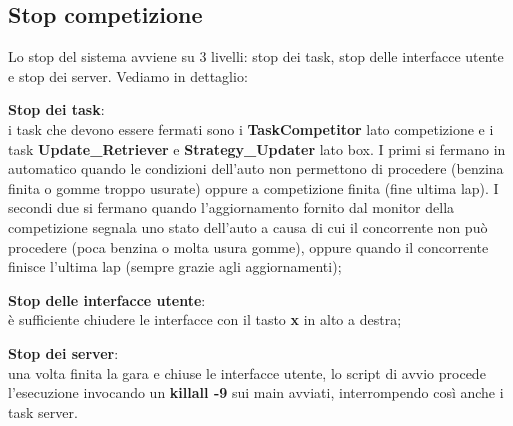 \subsection{Stop competizione}
Lo stop del sistema avviene su 3 livelli: stop dei task, stop delle interfacce
utente e stop dei server. Vediamo in dettaglio:
\begin{description}
\item{\textbf{Stop dei task}}:\\
i task che devono essere fermati sono i \textbf{TaskCompetitor} lato
competizione e i task \textbf{Update\_Retriever} e \textbf{Strategy\_Updater}
lato box.
I primi si fermano in automatico quando le condizioni dell'auto non permettono
di procedere (benzina finita o gomme troppo usurate) oppure a competizione
finita
(fine ultima lap). I secondi due si fermano quando l'aggiornamento fornito dal
monitor della competizione segnala uno stato dell'auto a causa di cui il 
concorrente non pu\`{o} procedere (poca benzina o molta usura gomme), oppure
quando il concorrente finisce l'ultima lap (sempre grazie agli aggiornamenti);
\item{\textbf{Stop delle interfacce utente}}:\\
\`{e} sufficiente chiudere le interfacce con il tasto \textbf{x} in alto a
destra;
\item{\textbf{Stop dei server}}:\\
una volta finita la gara e chiuse le interfacce utente, lo script di avvio
procede l'esecuzione invocando un \textbf{killall -9} sui main avviati,
interrompendo
cos\`{i} anche i task server.
\end{description}